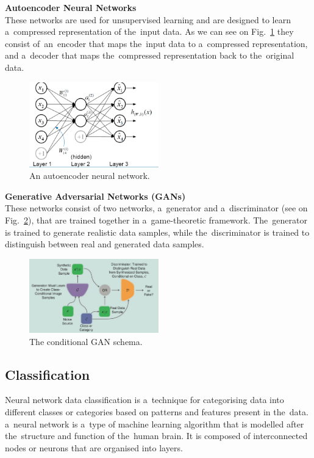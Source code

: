     \textbf{Autoencoder Neural Networks}\\
    These networks are used for unsupervised learning and are designed to learn a~compressed representation of the~input data. As we can see on Fig.~\ref{fig:ann} they consist of~an~encoder that maps the~input data to a~compressed representation, and a~decoder that maps the~compressed representation back to the~original data.
    \begin{center}
        \begin{figure}[]
            \centering
            \includegraphics[width=0.5\textwidth]{figures/ann}
            \caption{An autoencoder neural network. \cite{luo2018distributed}}
            \label{fig:ann}
        \end{figure}
    \end{center}
    \textbf{Generative Adversarial Networks (GANs)}\\
    These networks consist of two networks, a~generator and a~discriminator (see on Fig.~\ref{fig:gan}), that are trained together in a~game-theoretic framework. The~generator is trained to generate realistic data samples, while the~discriminator is trained to distinguish between real and generated data samples.
    \begin{center}
        \begin{figure}[!ht]
            \centering
            \includegraphics[width=0.5\textwidth]{figures/gan}
            \caption{The conditional GAN schema. \cite{creswell2018generative}}
            \label{fig:gan}
        \end{figure}
    \end{center}
    
    \subsection{Classification} \label{subsec:clasification}
    Neural network data classification is a~technique for categorising data into different classes or categories based on patterns and features present in the~data. a~neural network is a~type of machine learning algorithm that is modelled after the~structure and function of the~human brain. It is composed of interconnected nodes or neurons that are organised into layers.
    
